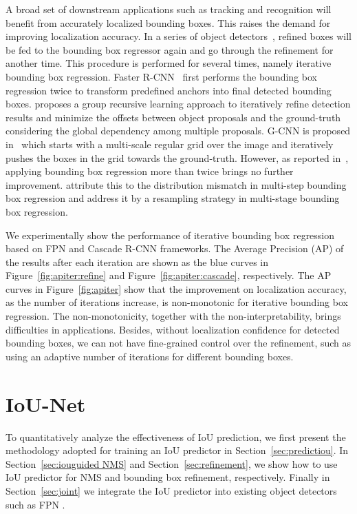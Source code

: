 \documentclass[runningheads]{llncs}
\begin{document}
A broad set of downstream applications such as tracking and recognition will benefit from accurately localized bounding boxes. This raises the demand for improving localization accuracy. In a series of object detectors~\cite{yang2016craft,gidaris2016attend,gidaris2015object,rajaram2016refinenet}, refined boxes will be fed to the bounding box regressor again and go through the refinement for another time. This procedure is performed for several times, namely iterative bounding box regression. Faster R-CNN~\cite{NIPS2015_5638} first performs the bounding box regression twice to transform predefined anchors into final detected bounding boxes. \cite{li2017multi} proposes a group recursive learning approach to iteratively refine detection results and minimize the offsets between object proposals and the ground-truth considering the global dependency among multiple proposals. G-CNN is proposed in~\cite{najibi2016g} which starts with a multi-scale regular grid over the image and iteratively pushes the boxes in the grid towards the ground-truth.
However, as reported in~\cite{cai2017cascade}, applying bounding box regression more than twice brings no further improvement. \cite{cai2017cascade} attribute this to the distribution mismatch in multi-step bounding box regression and address it by a resampling strategy in multi-stage bounding box regression.

We experimentally show the performance of iterative bounding box regression based on FPN and Cascade R-CNN frameworks. The Average Precision (AP) of the results after each iteration are shown as the blue curves in Figure~\ref{fig:apiter:refine} and Figure~\ref{fig:apiter:cascade}, respectively.
The AP curves in Figure~\ref{fig:apiter} show that the improvement on localization accuracy, as the number of iterations increase, is non-monotonic for iterative bounding box regression. The non-monotonicity, together with the non-interpretability, brings difficulties in applications.
Besides, without localization confidence for detected bounding boxes, we can not have fine-grained control over the refinement, such as using an adaptive number of iterations for different bounding boxes.
 \section{IoU-Net}
To quantitatively analyze the effectiveness of IoU prediction, we first present the methodology adopted for training an IoU predictor in Section~\ref{sec:predictiou}. In Section~\ref{sec:iouguided NMS} and Section~\ref{sec:refinement}, we show how to use IoU predictor for NMS and bounding box refinement, respectively. Finally in Section~\ref{sec:joint} we integrate the IoU predictor into existing object detectors such as FPN \cite{Lin_2017_CVPR}.
\end{document}
